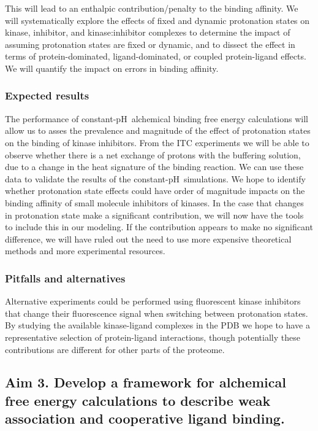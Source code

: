 \documentclass[10pt,final]{article}
\newcommand{\pH}{p$\mathrm{H}$\ }
\begin{document}
This will lead to an enthalpic contribution/penalty to the binding affinity.
%
We will systematically explore the effects of fixed and dynamic protonation states on kinase, inhibitor, and kinase:inhibitor complexes to determine the impact of assuming protonation states are fixed or dynamic, and to dissect the effect in terms of protein-dominated, ligand-dominated, or coupled protein-ligand effects.
%
We will quantify the impact on errors in binding affinity.

\subsubsection*{Expected results}
The performance of constant-\pH alchemical binding free energy calculations will allow us to asses the prevalence and magnitude of the effect of protonation states on the binding of kinase inhibitors.
%
From the ITC experiments we will be able to observe whether there is a net exchange of protons with the buffering solution, due to a change in the heat signature of the binding reaction.
%
We can use these data to validate the results of the constant-\pH simulations.
%
We hope to identify whether protonation state effects could have order of magnitude impacts on the binding affinity of small molecule inhibitors of kinases.
%
In the case that changes in protonation state make a significant contribution, we will now have the tools to include this in our modeling.
%
If the contribution appears to make no significant difference, we will have ruled out the need to use more expensive theoretical methods and more experimental resources.


\subsubsection*{Pitfalls and alternatives}
Alternative experiments could be performed using fluorescent kinase inhibitors that change their fluorescence signal when switching between protonation states.
%
By studying the available kinase-ligand complexes in the PDB we hope to have a representative selection of protein-ligand interactions, though potentially these contributions are different for other parts of the proteome.
%


\subsection*{Aim 3. Develop a framework for alchemical free energy calculations to describe weak association and cooperative ligand binding.}
\end{document}
